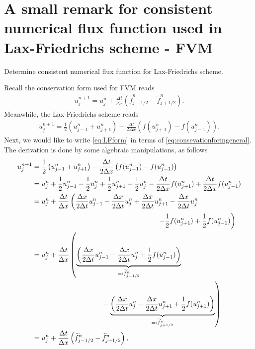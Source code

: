 \documentclass[12pt]{article}
\begin{document}
\section{A small remark for consistent numerical flux function used
  in Lax-Friedrichs scheme - FVM}
\begin{example}
	Determine consistent numerical flux function for Lax-Friedrichs scheme.
\end{example}
Recall the conservation form used for FVM reads
\begin{align}\label{eq:consevationformgeneral}
	u_{j}^{n+1} = u_{j}^{n} + \frac{\Delta t}{\Delta x}
	\left(
	\widetilde{f}_{j-1/2}^{n} - \widetilde{f}_{j+1/2}^{n}
	\right).
\end{align}
Meanwhile, the Lax-Friedrichs scheme reads
\begin{align}\label{eq:LFform}
	u_{j}^{n+1} = 
	\frac{1}{2}
	\left(
	u_{j-1}^{n} + u_{j+1}^{n}
	\right)
	-\frac{\Delta t}{2\Delta x}
	\left(
	f(u_{j+1}^{n}) - f(u_{j-1}^{n})
	\right).
\end{align}
Next, we would like to write \eqref{eq:LFform} in terms of \eqref{eq:consevationformgeneral}. 
The derivation is done by some algebraic manipulations, as follows
\begin{align}
	u_{j}^{n+1} & = 
	\frac{1}{2}
	\left(
	u_{j-1}^{n} + u_{j+1}^{n}
	\right)
	-\frac{\Delta t}{2\Delta x}
	\left(
	f(u_{j+1}^{n}) - f(u_{j-1}^{n})
	\right)                                    \notag                             \\
	            & =
	u_{j}^{n}
	+ \frac{1}{2} u_{j-1}^{n}  - \frac{1}{2}u_{j}^{n}
	+ \frac{1}{2}u_{j+1}^{n}  - \frac{1}{2}u_{j}^{n}
	-\frac{\Delta t}{2\Delta x} f(u_{j+1}^{n}) 
	+\frac{\Delta t}{2\Delta x} f(u_{j-1}^{n}) \notag                             \\	
	            & =
	u_{j}^{n}
	+ \frac{\Delta t}{\Delta x}
	\left(
	\frac{\Delta x}{2\Delta t}u_{j-1}^{n} 
	-\frac{\Delta x}{2\Delta t}u_{j}^{n} 
	+\frac{\Delta x}{2\Delta t}u_{j+1}^{n} 
	-\frac{\Delta x}{2\Delta t}u_{j}^{n} \right. \notag                           \\
	            & \qquad \qquad \qquad \qquad \qquad \qquad \qquad \qquad \qquad 
	\left.
	-\frac{1}{2}f(u_{j+1}^{n}) 
	+\frac{1}{2}f(u_{j-1}^{n}) 
	\right)                                     \notag                            \\
	            & =
	u_{j}^{n}
	+ \frac{\Delta t}{\Delta x}
	\left(
	\underbrace{\left(
	\frac{
		\Delta x}{2\Delta t}u_{j-1}^{n}
	-\frac{\Delta x}{2\Delta t}u_{j}^{n}
	+\frac{1}{2}f(u_{j-1}^{n}) 
	\right)}_{=:\widetilde{f}_{j-1/2}^{n}}
	\right.
	\notag                                                                        \\
	            & \qquad \qquad \qquad \qquad \qquad
	\left. -
	\underbrace{\left(
	\frac{\Delta x}{2\Delta t}u_{j}^{n}
	-\frac{\Delta x}{2\Delta t}u_{j+1}^{n}
	+\frac{1}{2}f(u_{j+1}^{n}) 
	\right)}_{=:\widetilde{f}_{j+1/2}^{n}}
	\right)\notag                                                                 \\
	            & =
	u_{j}^{n}
	+ \frac{\Delta t}{\Delta x}
	\left(
	\widetilde{f}_{j-1/2}^{n}
	-\widetilde{f}_{j+1/2}^{n}
	\right),
\end{align}
\end{document}
